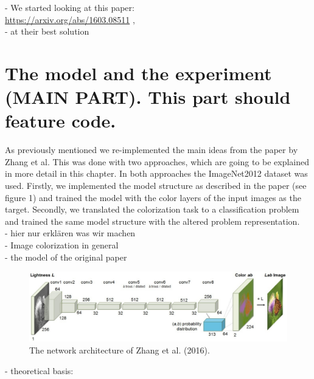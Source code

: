 \documentclass[12pt,letterpaper]{article}
\begin{document}

- We started looking at this paper: \\
\url{https://arxiv.org/abs/1603.08511} , \\
- at their best solution
\section{The model and the experiment (MAIN PART). This part should feature code.}
As previously mentioned we re-implemented the main ideas from the paper by Zhang et al. This was done with two approaches, which are going to be explained in more detail in this chapter. In both approaches the ImageNet2012 dataset was used. Firstly, we implemented the model structure as described in the paper (see figure 1) and trained the model with the color layers of the input images as the target. Secondly, we translated the colorization task to a classification problem and trained the same model structure with the altered problem representation.\\
- hier nur erklären was wir machen\\
- Image colorization in general\\
- the model of the original paper\\
\begin{figure}[ht]
	\centering
	\includegraphics[width=1.0\textwidth]{layer.png}
	\caption{The network architecture of Zhang et al. (2016). }
	\label{fig1}
\end{figure}
- theoretical basis:\\
\end{document}
